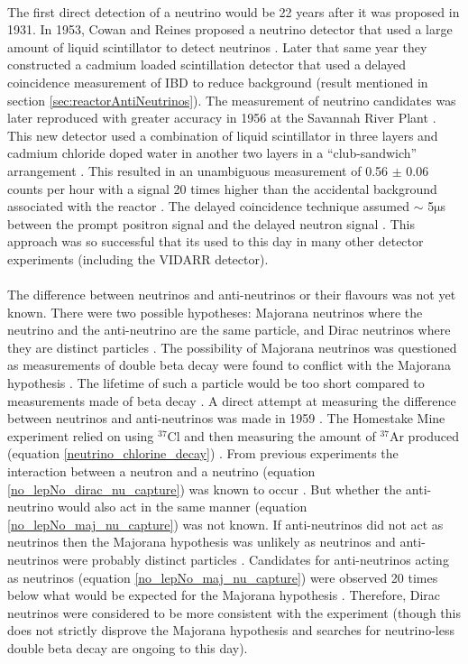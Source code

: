 \\The first direct detection of a neutrino would be 22 years after it was proposed in 1931. In 1953, Cowan and Reines proposed a neutrino detector that used a large amount of liquid scintillator to detect neutrinos \cite{reines1953proposed}. Later that same year they constructed a cadmium loaded scintillation detector that used a delayed coincidence measurement of IBD to reduce background \cite{reines1953proposed} \cite{reines1953detection} (result mentioned in section \ref{sec:reactorAntiNeutrinos}). The measurement of neutrino candidates was later reproduced with greater accuracy in 1956 at the Savannah River Plant \cite{Cowan1956Confirmation}. This new detector used a combination of liquid scintillator in three layers and cadmium chloride doped water in another two layers in a ``club-sandwich'' arrangement \cite{Cowan1956Confirmation}. This resulted in an unambiguous measurement of 0.56 $\pm$ 0.06 counts per hour with a signal 20 times higher than the accidental background associated with the reactor \cite{Cowan1956Confirmation}. The delayed coincidence technique assumed $\sim$ 5$\mathrm{\mu}$s between the prompt positron signal and the delayed neutron signal \cite{reines1953detection}. This approach was so successful that its used to this day in many other detector experiments (including the VIDARR detector).
\\\\The difference between neutrinos and anti-neutrinos or their flavours was not yet known. There were two possible hypotheses: Majorana neutrinos where the neutrino and the anti-neutrino are the same particle, and Dirac neutrinos where they are distinct particles  \cite{griffiths2008neutrino1.5} \cite{cowan1957test}. The possibility of Majorana neutrinos was questioned as measurements of double beta decay were found to conflict with the Majorana hypothesis \cite{cowan1957test}. The lifetime of such a particle would be too short compared to measurements made of beta decay \cite{cowan1957test}. A direct attempt at measuring the difference between neutrinos and anti-neutrinos was made in 1959 \cite{davis1959attempt}. The Homestake Mine experiment relied on using $^{37}$Cl and then measuring the amount of $^{37}$Ar produced (equation \ref{neutrino_chlorine_decay}) \cite{davis1959attempt}. From previous experiments the interaction between a neutron and a neutrino (equation \ref{no_lepNo_dirac_nu_capture}) was known to occur \cite{Cowan1956Confirmation}. But whether the anti-neutrino would also act in the same manner (equation \ref{no_lepNo_maj_nu_capture}) was not known. If anti-neutrinos did not act as neutrinos then the Majorana hypothesis was unlikely as neutrinos and anti-neutrinos were probably distinct particles  \cite{griffiths2008neutrino1.5} \cite{davis1959attempt}. Candidates for anti-neutrinos acting as neutrinos (equation \ref{no_lepNo_maj_nu_capture}) were observed 20 times below what would be expected for the Majorana hypothesis \cite{davis1959attempt}. Therefore, Dirac neutrinos were considered to be more consistent with the experiment (though this does not strictly disprove the Majorana hypothesis \cite{griffiths2008neutrino1.5} and searches for neutrino-less double beta decay are ongoing to this day). 
